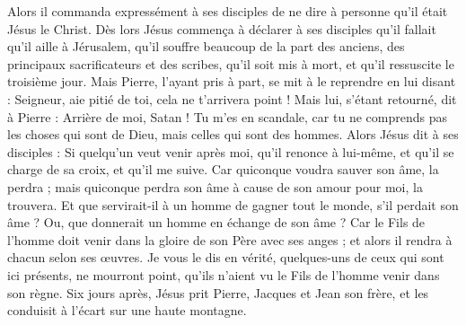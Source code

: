 \begin{multicols}{2}
Alors il commanda expressément à ses disciples de ne dire à personne qu'il était Jésus le Christ.
Dès lors Jésus commença à déclarer à ses disciples qu'il fallait qu'il aille à Jérusalem, qu'il souffre beaucoup de la part des anciens, des principaux sacrificateurs et des scribes, qu'il soit mis à mort, et qu'il ressuscite le troisième jour.
Mais Pierre, l'ayant pris à part, se mit à le reprendre en lui disant : Seigneur, aie pitié de toi, cela ne t'arrivera point !
Mais lui, s'étant retourné, dit à Pierre : Arrière de moi, Satan ! Tu m'es en scandale, car tu ne comprends pas les choses qui sont de Dieu, mais celles qui sont des hommes.
Alors Jésus dit à ses disciples : Si quelqu'un veut venir après moi, qu'il renonce à lui-même, et qu'il se charge de sa croix, et qu'il me suive.
Car quiconque voudra sauver son âme, la perdra ; mais quiconque perdra son âme à cause de son amour pour moi, la trouvera.
Et que servirait-il à un homme de gagner tout le monde, s'il perdait son âme ? Ou, que donnerait un homme en échange de son âme ?
Car le Fils de l'homme doit venir dans la gloire de son Père avec ses anges ; et alors il rendra à chacun selon ses œuvres.
Je vous le dis en vérité, quelques-uns de ceux qui sont ici présents, ne mourront point, qu'ils n'aient vu le Fils de l'homme venir dans son règne.
\VerseOne{}Six jours après, Jésus prit Pierre, Jacques et Jean son frère, et les conduisit à l'écart sur une haute montagne.

\end{multicols}
